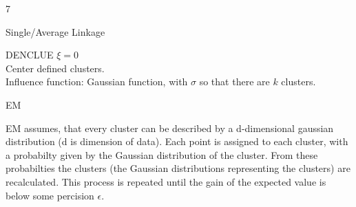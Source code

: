 \documentclass{article}
\begin{document}
    \begin{ukon-infie}[12.12.17]{7}

        \begin{exercise}[p=7]{Single/Average Linkage}      

		\end{exercise}
		
		\begin{exercise}[p=2]{DENCLUE}
		$\xi=0$\\
		Center defined clusters.\\
		Influence function: Gaussian function, with $\sigma$ so that there are $k$ clusters.\\
		\end{exercise}
		
		\begin{exercise}[p=7]{EM}
		
		\question{}
		{
			EM assumes, that every cluster can be described by a d-dimensional gaussian distribution (d is dimension of data). Each point is assigned to each cluster, with a probabilty given by the Gaussian distribution of the cluster. From these probabilties the clusters (the Gaussian distributions representing the clusters) are recalculated. This process is repeated until the gain of the expected value is below some percision $\epsilon$.
		}
		

\end{exercise}
\end{ukon-infie}
\end{document}
